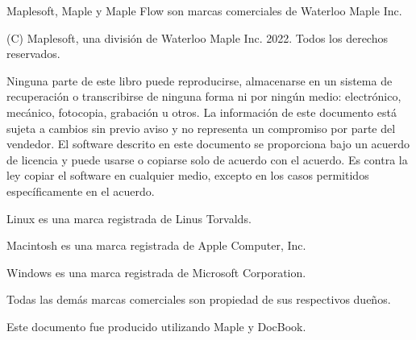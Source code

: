 \documentclass[
	spanish, %
	letterpaper, oneside
]{article}
\begin{document}
	
\templatePortrait

\templatePagecfg

\begin{abstractd}
Maplesoft, Maple y Maple Flow son marcas comerciales de Waterloo Maple Inc.

(C) Maplesoft, una división de Waterloo Maple Inc. 2022. Todos los derechos reservados.

Ninguna parte de este libro puede reproducirse, almacenarse en un sistema de recuperación o transcribirse de ninguna forma ni por ningún medio: electrónico, mecánico, fotocopia, grabación u otros. La información de este documento está sujeta a cambios sin previo aviso y no representa un compromiso por parte del vendedor. El software descrito en este documento se proporciona bajo un acuerdo de licencia y puede usarse o copiarse solo de acuerdo con el acuerdo. Es contra la ley copiar el software en cualquier medio, excepto en los casos permitidos específicamente en el acuerdo.

Linux es una marca registrada de Linus Torvalds.

Macintosh es una marca registrada de Apple Computer, Inc.

Windows es una marca registrada de Microsoft Corporation.

Todas las demás marcas comerciales son propiedad de sus respectivos dueños.

Este documento fue producido utilizando Maple y DocBook.

\end{abstractd}

\templateIndex

\templateFinalcfg

%



\end{document}
